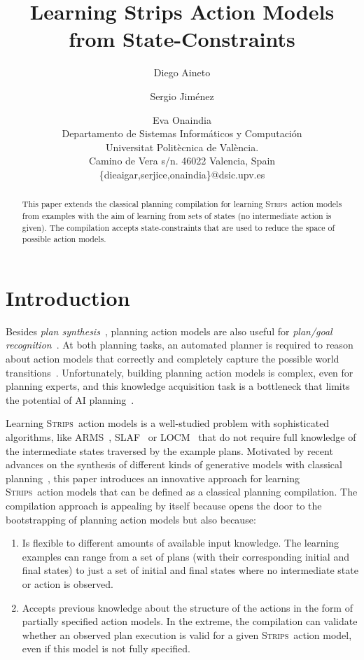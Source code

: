 \documentclass{article}
\title{Learning Strips Action Models from State-Constraints}
\author{Diego Aineto\and Sergio Jim\'enez\and Eva Onaindia\\
{\small Departamento de Sistemas Inform\'aticos y Computaci\'on}\\
{\small Universitat Polit\`ecnica de Val\`encia.}\\
{\small Camino de Vera s/n. 46022 Valencia, Spain}\\
{\small \{dieaigar,serjice,onaindia\}@dsic.upv.es}}
\newcommand{\strips}{\textsc{Strips}}     %
\begin{document}
\maketitle

\begin{abstract}
This paper extends the classical planning compilation for learning \strips\ action models from examples with the aim of learning from sets of states (no intermediate action is given). The compilation accepts state-constraints that are used to reduce the space of possible action models.
\end{abstract}

\section{Introduction}
Besides {\em plan synthesis}~\cite{ghallab2004automated}, planning action models are also useful for {\em plan/goal recognition}~\cite{ramirez2012plan}. At both planning tasks, an automated planner is required to reason about action models that correctly and completely capture the possible world transitions~\cite{geffner:book:2013}. Unfortunately, building planning action models is complex, even for planning experts, and this knowledge acquisition task is a bottleneck that limits the potential of AI planning~\cite{kambhampati:modellite:AAAI2007}.

Learning \strips\ action models is a well-studied problem with sophisticated algorithms, like {\sc ARMS}~\cite{yang2007learning}, {\sc SLAF}~\cite{amir:alearning:JAIR08} or {\sc LOCM}~\cite{cresswell2013acquiring} that do not require full knowledge of the intermediate states traversed by the example plans. Motivated by recent advances on the synthesis of different kinds of generative models with classical planning~\cite{bonet2009automatic,segovia2016hierarchical,segovia2017generating}, this paper introduces an innovative approach for learning \strips\ action models that can be defined as a classical planning compilation. The compilation approach is appealing by itself because opens the door to the bootstrapping of planning action models but also because:
\begin{enumerate}
\item Is flexible to different amounts of available input knowledge. The learning examples can range from a set of plans (with their corresponding initial and final states) to just a set of initial and final states where no intermediate state  or action is observed.
\item Accepts previous knowledge about the structure of the actions in the form of partially specified action models. In the extreme, the compilation can validate whether an observed plan execution is valid for a given \strips\ action model, even if this model is not fully specified.
\end{enumerate}
\end{document}
